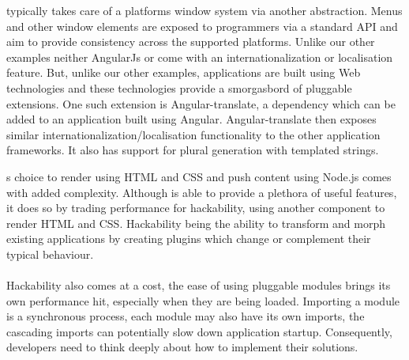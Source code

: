    typically takes care of a platforms window system via another abstraction. Menus\cite{electron_menu} and other window elements are exposed to programmers via a standard API and aim to provide consistency across the supported platforms.
  Unlike our other examples neither AngularJs or  come with an internationalization or localisation feature. But, unlike our other examples,  applications are built using Web technologies and these technologies provide a smorgasbord of pluggable extensions. One such extension is Angular-translate, a dependency which can be added to an application built using Angular\cite{angular_translate}. Angular-translate then exposes similar internationalization/localisation functionality to the other application frameworks. It also has support for plural generation with templated strings.

  s choice to render using HTML and CSS and push content using Node.js comes with added complexity. Although  is able to provide a plethora of useful features, it does so by trading performance for hackability, using another component to render HTML and CSS. Hackability being the ability to transform and morph existing applications by creating plugins which change or complement their typical behaviour.\\\\
  Hackability also comes at a cost, the ease of using pluggable modules brings its own performance hit, especially when they are being loaded. Importing a module is a synchronous process, each module may also have its own imports, the cascading imports can potentially slow down application startup. Consequently, developers need to think deeply about how to implement their solutions.


